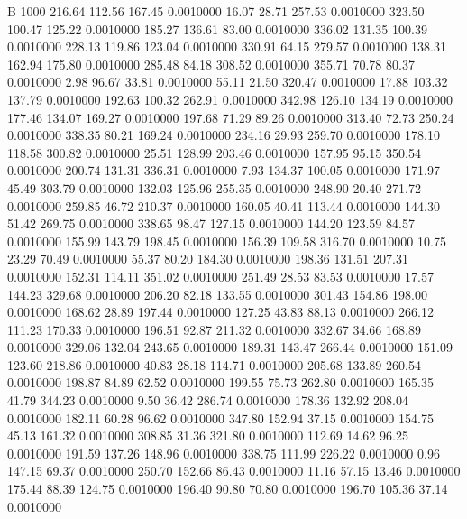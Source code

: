 


B 1000
 216.64  112.56  167.45   0.0010000
  16.07   28.71  257.53   0.0010000
 323.50  100.47  125.22   0.0010000
 185.27  136.61   83.00   0.0010000
 336.02  131.35  100.39   0.0010000
 228.13  119.86  123.04   0.0010000
 330.91   64.15  279.57   0.0010000
 138.31  162.94  175.80   0.0010000
 285.48   84.18  308.52   0.0010000
 355.71   70.78   80.37   0.0010000
   2.98   96.67   33.81   0.0010000
  55.11   21.50  320.47   0.0010000
  17.88  103.32  137.79   0.0010000
 192.63  100.32  262.91   0.0010000
 342.98  126.10  134.19   0.0010000
 177.46  134.07  169.27   0.0010000
 197.68   71.29   89.26   0.0010000
 313.40   72.73  250.24   0.0010000
 338.35   80.21  169.24   0.0010000
 234.16   29.93  259.70   0.0010000
 178.10  118.58  300.82   0.0010000
  25.51  128.99  203.46   0.0010000
 157.95   95.15  350.54   0.0010000
 200.74  131.31  336.31   0.0010000
   7.93  134.37  100.05   0.0010000
 171.97   45.49  303.79   0.0010000
 132.03  125.96  255.35   0.0010000
 248.90   20.40  271.72   0.0010000
 259.85   46.72  210.37   0.0010000
 160.05   40.41  113.44   0.0010000
 144.30   51.42  269.75   0.0010000
 338.65   98.47  127.15   0.0010000
 144.20  123.59   84.57   0.0010000
 155.99  143.79  198.45   0.0010000
 156.39  109.58  316.70   0.0010000
  10.75   23.29   70.49   0.0010000
  55.37   80.20  184.30   0.0010000
 198.36  131.51  207.31   0.0010000
 152.31  114.11  351.02   0.0010000
 251.49   28.53   83.53   0.0010000
  17.57  144.23  329.68   0.0010000
 206.20   82.18  133.55   0.0010000
 301.43  154.86  198.00   0.0010000
 168.62   28.89  197.44   0.0010000
 127.25   43.83   88.13   0.0010000
 266.12  111.23  170.33   0.0010000
 196.51   92.87  211.32   0.0010000
 332.67   34.66  168.89   0.0010000
 329.06  132.04  243.65   0.0010000
 189.31  143.47  266.44   0.0010000
 151.09  123.60  218.86   0.0010000
  40.83   28.18  114.71   0.0010000
 205.68  133.89  260.54   0.0010000
 198.87   84.89   62.52   0.0010000
 199.55   75.73  262.80   0.0010000
 165.35   41.79  344.23   0.0010000
   9.50   36.42  286.74   0.0010000
 178.36  132.92  208.04   0.0010000
 182.11   60.28   96.62   0.0010000
 347.80  152.94   37.15   0.0010000
 154.75   45.13  161.32   0.0010000
 308.85   31.36  321.80   0.0010000
 112.69   14.62   96.25   0.0010000
 191.59  137.26  148.96   0.0010000
 338.75  111.99  226.22   0.0010000
   0.96  147.15   69.37   0.0010000
 250.70  152.66   86.43   0.0010000
  11.16   57.15   13.46   0.0010000
 175.44   88.39  124.75   0.0010000
 196.40   90.80   70.80   0.0010000
 196.70  105.36   37.14   0.0010000
